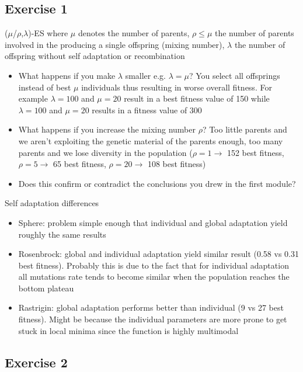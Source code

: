 \subsection{Exercise 1}
($\mu$/$\rho$,$\lambda$)-ES where $\mu$ denotes the number of parents, $\rho\leq\mu$ the number of parents involved in the producing a single offspring (mixing number), $\lambda$ the number of offspring without self adaptation or recombination

\begin{itemize}
    \item What happens if you make $\lambda$ smaller e.g. $\lambda=\mu$? You select all offsprings instead of best $\mu$ individuals thus resulting in worse overall fitness. For example $\lambda=100$ and $\mu=20$ result in a best fitness value of 150 while $\lambda=100$ and $\mu=20$ results in a fitness value of 300 
    \item What happens if you increase the mixing number $\rho$? Too little parents and we aren't exploiting the genetic material of the parents enough, too many parents and we lose diversity in the population ($\rho=1 \rightarrow $ 152 best fitness, $\rho=5 \rightarrow $ 65 best fitness, $\rho=20 \rightarrow $ 108 best fitness)
    \item Does this confirm or contradict the conclusions you drew in the first module?
\end{itemize}

Self adaptation differences
\begin{itemize}
    \item Sphere: problem simple enough that individual and global adaptation yield roughly the same results
    \item Rosenbrock: global and individual adaptation yield similar result (0.58 vs 0.31 best fitness). Probably this is due to the fact that for individual adaptation all mutations rate tends to become similar when the population reaches the bottom plateau
    \item Rastrigin: global adaptation performs better than individual (9 vs 27 best fitness). Might be because the individual parameters are more prone to get stuck in local minima since the function is highly multimodal
\end{itemize}

\subsection{Exercise 2}
